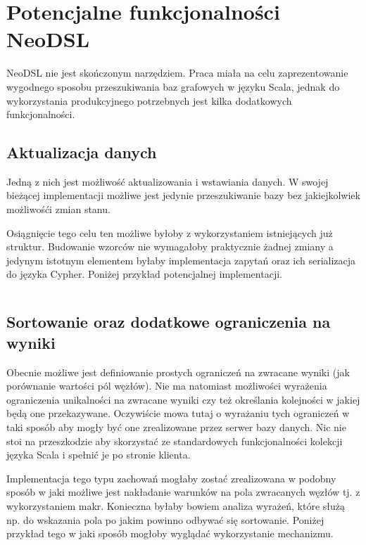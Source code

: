 \documentclass[brudnopis]{xmgr}
\begin{document}
\section{Potencjalne funkcjonalności NeoDSL}

NeoDSL nie jest skończonym narzędziem. Praca miała na celu zaprezentowanie wygodnego sposobu przeszukiwania baz grafowych w języku Scala, jednak do wykorzystania produkcyjnego potrzebnych jest kilka dodatkowych funkcjonalności.

\subsection{Aktualizacja danych}

Jedną z nich jest możliwość aktualizowania i wstawiania danych. W swojej bieżącej implementacji możliwe jest jedynie przeszukiwanie bazy bez jakiejkolwiek możliwośći zmian stanu. 

Osiągnięcie tego celu ten możliwe byłoby z wykorzystaniem istniejących już struktur. Budowanie wzorców nie wymagałoby praktycznie żadnej zmiany a jedynym istotnym elementem byłaby implementacja zapytań oraz ich serializacja do języka Cypher. Poniżej przykład potencjalnej implementacji.

\inputminted{scala}{listings/scala/missing-features-update.scala}

\subsection{Sortowanie oraz dodatkowe ograniczenia na wyniki}

Obecnie możliwe jest definiowanie prostych ograniczeń na zwracane wyniki (jak porównanie wartości pól węzłów). Nie ma natomiast możliwości wyrażenia ograniczenia unikalności na zwracane wyniki czy też określania kolejności w jakiej będą one przekazywane. Oczywiście mowa tutaj o wyrażaniu tych ograniczeń w taki sposób aby mogły być one zrealizowane przez serwer bazy danych. Nic nie stoi na przeszkodzie aby skorzystać ze standardowych funkcjonalności kolekcji języka Scala i spełnić je po stronie klienta.

Implementacja tego typu zachowań mogłaby zostać zrealizowana w podobny sposób w jaki możliwe jest nakładanie warunków na pola zwracanych węzłów tj. z wykorzystaniem makr. Konieczna byłaby bowiem analiza wyrażeń, które służą np. do wskazania pola po jakim powinno odbywać się sortowanie. Poniżej przykład tego w jaki sposób mogłoby wyglądać wykorzystanie mechanizmu.
\end{document}
